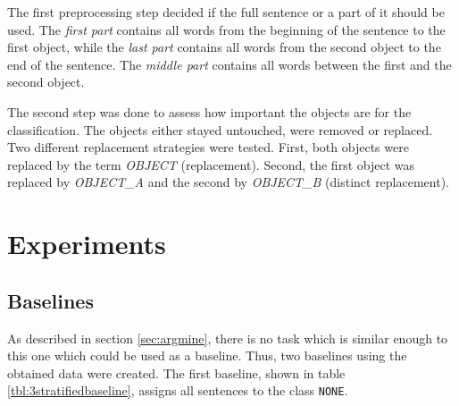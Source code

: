 The first preprocessing step decided if the full sentence or a part of it should be used. The \emph{first part} contains all words from the beginning of the sentence to the first object, while the \emph{last part} contains all words from the second object to the end of the sentence. The \emph{middle part} contains all words between the first and the second object.

The second step was done to assess how important the objects are for the classification. The objects either stayed untouched, were removed or replaced. Two different replacement strategies were tested. First, both objects were replaced by the term \emph{OBJECT} (replacement). Second, the first object was replaced by \emph{OBJECT\_A} and the second by \emph{OBJECT\_B} (distinct replacement).





\section{Experiments}
\subsection{Baselines}
\label{sec:3_baseline}
As described in section \ref{sec:argmine}, there is no task which is similar enough to this one which could be used as a baseline. Thus, two baselines using the obtained data were created. The first baseline, shown in table \ref{tbl:3stratifiedbaseline}, assigns all sentences to the class \texttt{NONE}.

